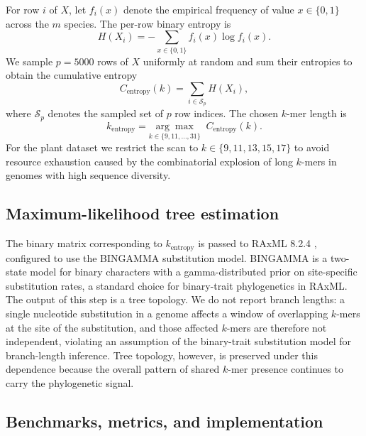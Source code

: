 \documentclass[11pt]{article}
\begin{document}
For row $i$ of $X$, let $f_i(x)$ denote the empirical frequency of value
$x \in \{0, 1\}$ across the $m$ species. The per-row binary entropy is
\begin{equation}
H(X_i) = -\sum_{x \in \{0, 1\}} f_i(x) \log f_i(x).
\end{equation}
We sample $p = 5000$ rows of $X$ uniformly at random and sum their
entropies to obtain the cumulative entropy
\begin{equation}
C_\mathrm{entropy}(k) = \sum_{i \in \mathcal{S}_p} H(X_i),
\end{equation}
where $\mathcal{S}_p$ denotes the sampled set of $p$ row indices. The chosen
$k$-mer length is
\begin{equation}
k_\mathrm{entropy} = \underset{k \in \{9, 11, \ldots, 31\}}{\arg\max}\;\;
C_\mathrm{entropy}(k).
\end{equation}
For the plant dataset we restrict the scan to
$k \in \{9, 11, 13, 15, 17\}$ to avoid resource exhaustion caused by the
combinatorial explosion of long $k$-mers in genomes with high sequence
diversity.

\subsection{Maximum-likelihood tree estimation}

The binary matrix corresponding to $k_\mathrm{entropy}$ is passed to RAxML
8.2.4 \citep{stamatakis2014raxml}, configured to use the BINGAMMA
substitution model. BINGAMMA is a two-state model for binary characters with
a gamma-distributed prior on site-specific substitution rates, a standard
choice for binary-trait phylogenetics in RAxML. The output of this step is a
tree topology. We do not report branch lengths: a single nucleotide
substitution in a genome affects a window of overlapping $k$-mers at the
site of the substitution, and those affected $k$-mers are therefore not
independent, violating an assumption of the binary-trait substitution model
for branch-length inference. Tree topology, however, is preserved under
this dependence because the overall pattern of shared $k$-mer presence
continues to carry the phylogenetic signal.

\subsection{Benchmarks, metrics, and implementation}
\end{document}
